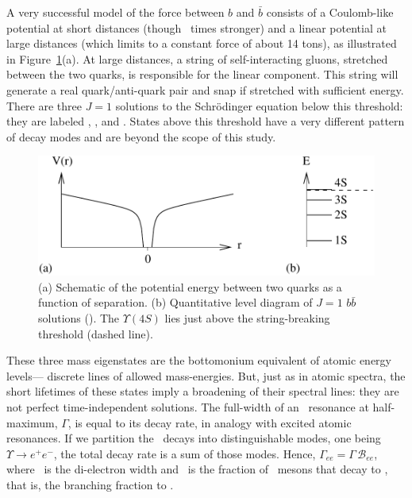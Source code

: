 \documentclass{cornell}
\begin{document}
A very successful model of the force between $b$ and $\bar{b}$
consists of a Coulomb-like potential at short distances (though \bork\
times stronger) and a linear potential at large distances (which
limits to a constant force of about 14 tons), as illustrated in
Figure~\ref{cornellpotential}(a).  At large distances, a string of
self-interacting gluons, stretched between the two quarks, is
responsible for the linear component.  This string will generate a
real quark/anti-quark pair and snap if stretched with sufficient
energy.  There are three $J=1$ solutions to the Schr\"odinger equation
below this threshold: they are labeled \us, \uss, and \usss.  States
above this threshold have a very different pattern of decay modes and
are beyond the scope of this study.

\begin{figure}[p]
  \begin{center}
    \includegraphics[width=0.8\linewidth]{plots/cornellpotential}
  \end{center}
  \caption{\label{cornellpotential} (a) Schematic of the potential
  energy between two quarks as a function of separation.  (b)
  Quantitative level diagram of $J=1$ $b\bar{b}$ solutions (\ups).
  The $\Upsilon(4S)$ lies just above the string-breaking threshold
  (dashed line).}
\end{figure}

These three mass eigenstates are the bottomonium equivalent of atomic
energy levels--- discrete lines of allowed mass-energies.  But, just
as in atomic spectra, the short lifetimes of these states imply a
broadening of their spectral lines: they are not perfect
time-independent solutions.  The full-width of an \ups\ resonance at
half-maximum, $\Gamma$, is equal to its decay rate, in analogy with
excited atomic resonances.  If we partition the \ups\ decays into
distinguishable modes, one being $\Upsilon \to e^+e^-$, the total
decay rate is a sum of those modes.  Hence, $\Gamma_{ee} = \Gamma \,
{\mathcal B}_{ee}$, where \gee\ is the di-electron width and \bee\ is
the fraction of \ups\ mesons that decay to \ee, that is, the branching
fraction to \ee.
  
\end{document}
